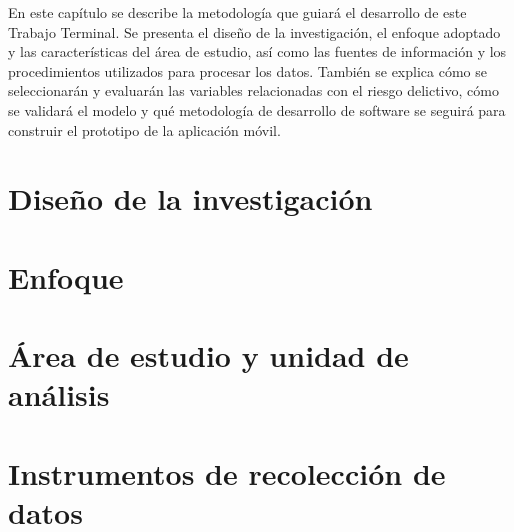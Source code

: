 En este capítulo se describe la metodología que guiará el desarrollo de este Trabajo Terminal. Se presenta el diseño de la investigación, el enfoque adoptado y las características del área de estudio, así como las fuentes de información y los procedimientos utilizados para procesar los datos. También se explica cómo se seleccionarán y evaluarán las variables relacionadas con el riesgo delictivo, cómo se validará el modelo y qué metodología de desarrollo de software se seguirá para construir el prototipo de la aplicación móvil.

\section{Diseño de la investigación}
\label{sec:diseno_investigacion}


\section{Enfoque}
\label{sec:enfoque}


\section{Área de estudio y unidad de análisis}
\label{sec:area_estudio}


\section{Instrumentos de recolección de datos}
\label{sec:instrumentos_recoleccion}


